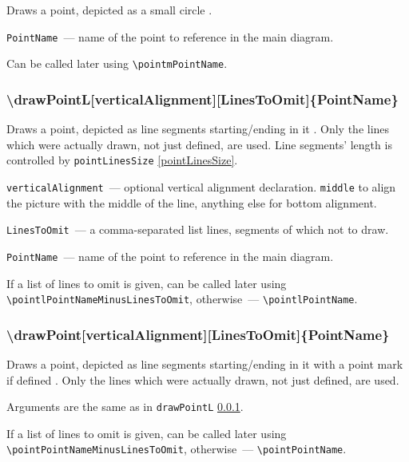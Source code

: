 	Draws a point, depicted as a small circle .
	
	\texttt{PointName}~— name of the point to reference in the main diagram. 
	
	Can be called later using \texttt{\textbackslash pointmPointName}. 

\subsubsection{\textbackslash drawPointL[verticalAlignment][LinesToOmit]\{PointName\}}\label{drawPointL}

	Draws a point, depicted as line segments starting/ending in it . Only the lines which were actually drawn, not just defined, are used. Line segments' length is controlled by \texttt{pointLinesSize} \ref{pointLinesSize}.

	\texttt{verticalAlignment}~— optional vertical alignment declaration. \texttt{middle} to align the picture with the middle of the line, anything else for bottom alignment.
	
	\texttt{LinesToOmit}~— a comma-separated list lines, segments of which not to draw. 
	
	\texttt{PointName}~— name of the point to reference in the main diagram. 
	
	If a list of lines to omit is given, can be called later using \texttt{\textbackslash pointlPointNameMinusLinesToOmit}, otherwise~— \texttt{\textbackslash pointlPointName}. 

\subsubsection{\textbackslash drawPoint[verticalAlignment][LinesToOmit]\{PointName\}}

	Draws a point, depicted as line segments starting/ending in it with a point mark if defined . Only the lines which were actually drawn, not just defined, are used.

	Arguments are the same as in \texttt{drawPointL} \ref{drawPointL}.
	
	If a list of lines to omit is given, can be called later using \texttt{\textbackslash pointPointNameMinusLinesToOmit}, otherwise~— \texttt{\textbackslash pointPointName}. 





